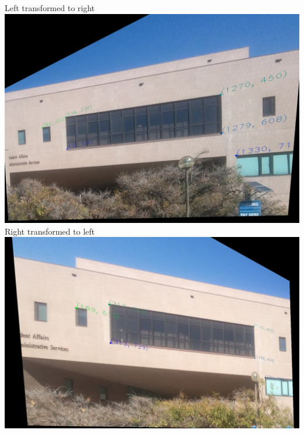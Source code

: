 \documentclass{article}
\begin{document}
Left transformed to right 
\includegraphics[width=\linewidth]{./results/building/left_transformed.jpg}
Right transformed to left
\includegraphics[width=\linewidth]{./results/building/right_transformed.jpg}
\end{document}
